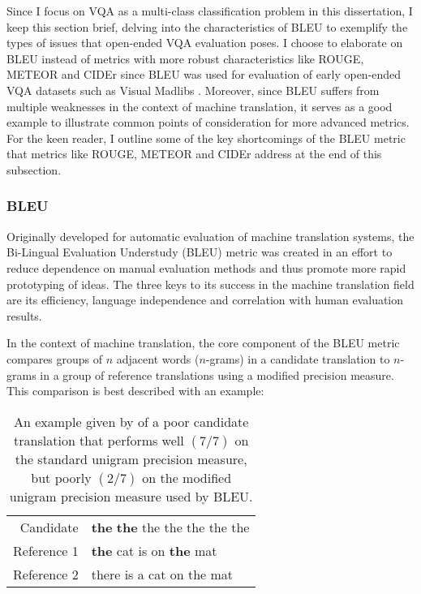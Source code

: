 Since I focus on VQA as a multi-class classification problem in this dissertation, I keep this section brief, delving into the characteristics of BLEU to exemplify the types of issues that open-ended VQA evaluation poses. I choose to elaborate on BLEU instead of metrics with more robust characteristics like ROUGE, METEOR and CIDEr since BLEU was used for evaluation of early open-ended VQA datasets such as Visual Madlibs \cite{yu2015visual}. Moreover, since BLEU suffers from multiple weaknesses \cite{banerjee2005meteor} in the context of machine translation, it serves as a good example to illustrate common points of consideration for more advanced metrics. For the keen reader, I outline some of the key shortcomings of the BLEU metric that metrics like ROUGE, METEOR and CIDEr address at the end of this subsection.

\subsubsection{BLEU}

Originally developed for automatic evaluation of machine translation systems, the Bi-Lingual Evaluation Understudy (BLEU) metric was created in an effort to reduce dependence on manual evaluation methods and thus promote more rapid prototyping of ideas. The three keys to its success in the machine translation field are its efficiency, language independence and correlation with human evaluation results.

In the context of machine translation, the core component of the BLEU metric compares groups of \(n\) adjacent words (\(n\)-grams) in a candidate translation to \(n\)-grams in a group of reference translations using a modified precision measure. This comparison is best described with an example:

\begin{table}[htbp]
    \centering
    \begin{tabular}{r|l}
        Candidate & \textbf{the} \textbf{the} the the the the the \\
        Reference 1 & \textbf{the} cat is on \textbf{the} mat \\
        Reference 2 & there is a cat on the mat \\
    \end{tabular}
    \caption[An illustration of BLEU's modified \(n\)-gram precision measure \cite{papineni2002bleu}]{An example given by \cite{papineni2002bleu} of a poor candidate translation that performs well \((7/7)\) on the standard unigram precision measure, but poorly \((2/7)\) on the modified unigram precision measure used by BLEU.}
    \label{tab:bleu_ngraph_precision}
\end{table}

